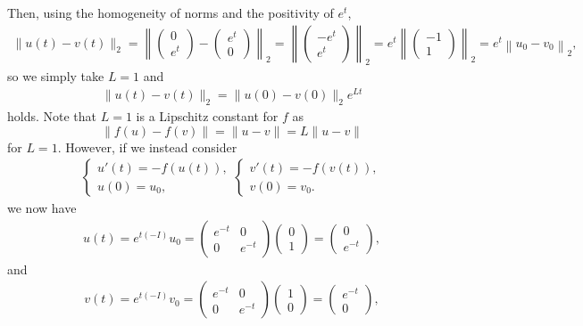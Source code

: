 \documentclass{article}
\begin{document}
Then, using the homogeneity of norms and the positivity of $e^t$,
\begin{align*}
\|u(t) - v(t)\|_2 =\left\|\begin{pmatrix}
	0\\e^t
\end{pmatrix}-\begin{pmatrix}
e^t\\0
\end{pmatrix}\right\|_2=\left\|\begin{pmatrix}
-e^t\\e^t
\end{pmatrix}\right\|_2=e^t\left\|\begin{pmatrix}
-1\\1
\end{pmatrix}\right\|_2=e^t\left\|u_0-v_0\right\|_2,
\end{align*}
so we simply take $L=1$ and 
\begin{align*}
	\|u(t) - v(t)\|_2 = \|u(0) - v(0)\|_2 e^{L t}
\end{align*}
holds. Note that $L=1$ is a Lipschitz constant for $f$ as 
\[
\|f(u)-f(v)\|=\|u-v\|=L\|u-v\|
\]
for $L=1$. However, if we instead consider 
\begin{align*}
	\begin{cases}
	u'(t) = -f(u(t)),\\
	u(0) = u_0,
\end{cases}
\begin{cases}
	v'(t) = -f(v(t)),\\
	v(0) = v_0.
\end{cases}
\end{align*}
we now have 
\begin{align*}
	u(t)=e^{t(-I)}u_0=\begin{pmatrix}
		e^{-t} &0\\
		0 &e^{-t}
	\end{pmatrix}\begin{pmatrix}
		0\\1
	\end{pmatrix}=\begin{pmatrix}
		0\\e^{-t}
	\end{pmatrix},
\end{align*}
and 
\begin{align*}
	v(t)=e^{t(-I)}v_0=\begin{pmatrix}
		e^{-t} &0\\
		0 &e^{-t}
	\end{pmatrix}\begin{pmatrix}
		1\\0
	\end{pmatrix}=\begin{pmatrix}
		e^{-t}\\0
	\end{pmatrix},
\end{align*}
\end{document}
